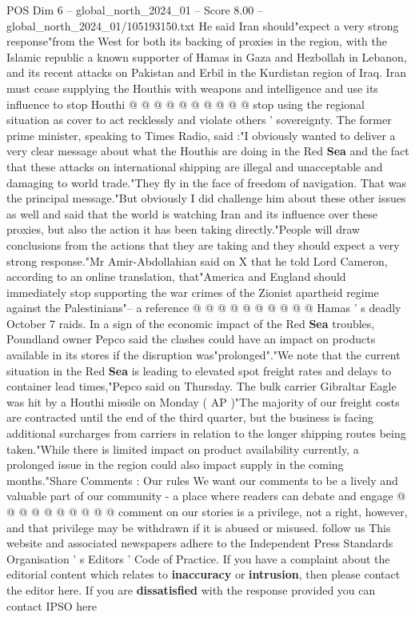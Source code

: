 \begin{textsample}{POS Dim 6 – global\_north\_2024\_01 – Score 8.00 – global\_north\_2024\_01/105193150.txt}
He said Iran should"expect a very strong response"from the West for both its backing of proxies in the region, with the Islamic republic a known supporter of Hamas in Gaza and Hezbollah in Lebanon, and its recent attacks on Pakistan and Erbil in the Kurdistan region of Iraq.
Iran must cease supplying the Houthis with weapons and intelligence and use its influence to stop Houthi @ @ @ @ @ @ @ @ @ @ stop using the regional situation as cover to act recklessly and violate others ' sovereignty.
The former prime minister, speaking to Times Radio, said :"I obviously wanted to deliver a very clear message about what the Houthis are doing in the Red \textbf{Sea} and the fact that these attacks on international shipping are illegal and unacceptable and damaging to world trade."They fly in the face of freedom of navigation.
That was the principal message."But obviously I did challenge him about these other issues as well and said that the world is watching Iran and its influence over these proxies, but also the action it has been taking directly."People will draw conclusions from the actions that they are taking and they should expect a very strong response."Mr Amir-Abdollahian said on X that he told Lord Cameron, according to an online translation, that"America and England should immediately stop supporting the war crimes of the Zionist apartheid regime against the Palestinians"-- a reference @ @ @ @ @ @ @ @ @ @ Hamas ' s deadly October 7 raids.
In a sign of the economic impact of the Red \textbf{Sea} troubles, Poundland owner Pepco said the clashes could have an impact on products available in its stores if the disruption was"prolonged"."We note that the current situation in the Red \textbf{Sea} is leading to elevated spot freight rates and delays to container lead times,"Pepco said on Thursday.
The bulk carrier Gibraltar Eagle was hit by a Houthi missile on Monday ( AP )"The majority of our freight costs are contracted until the end of the third quarter, but the business is facing additional surcharges from carriers in relation to the longer shipping routes being taken."While there is limited impact on product availability currently, a prolonged issue in the region could also impact supply in the coming months."Share Comments : Our rules We want our comments to be a lively and valuable part of our community - a place where readers can debate and engage @ @ @ @ @ @ @ @ @ @ comment on our stories is a privilege, not a right, however, and that privilege may be withdrawn if it is abused or misused. follow us This website and associated newspapers adhere to the Independent Press Standards Organisation ' s Editors ' Code of Practice.
If you have a complaint about the editorial content which relates to \textbf{inaccuracy} or \textbf{intrusion}, then please contact the editor here.
If you are \textbf{dissatisfied} with the response provided you can contact IPSO here

\end{textsample}
